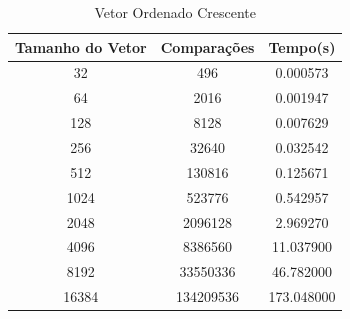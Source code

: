 \documentclass[12pt,a4paper,twoside]{report}
\begin{document}
\begin{table}[h]
  \centering
  \caption{Vetor Ordenado Crescente \label{tab:oc}}
  \begin{tabular}{ccc} \\\hline
  \textbf{Tamanho do Vetor} & \textbf{Comparações} & \textbf{Tempo(s)} \\\hline
  32                        & 496                  & 0.000573          \\\hline
  64                        & 2016                 & 0.001947          \\\hline
  128                       & 8128                 & 0.007629          \\\hline
  256                       & 32640                & 0.032542          \\\hline
  512                       & 130816               & 0.125671          \\\hline
  1024                      & 523776               & 0.542957          \\\hline
  2048                      & 2096128              & 2.969270          \\\hline
  4096                      & 8386560              & 11.037900         \\\hline
  8192                      & 33550336             & 46.782000         \\\hline
  16384                     & 134209536            & 173.048000       \\\hline
  \end{tabular}
\end{table}
\end{document}
